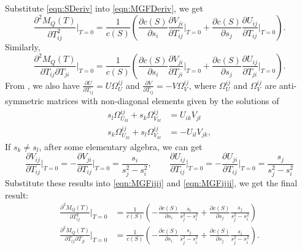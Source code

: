 \documentclass[10pt]{article}
\begin{document}
Substitute \eqref{eqn:SDeriv} into \eqref{eqn:MGFDeriv}, we get
\begin{equation} \label{eqn:MGFijij}
	\frac{\partial^2 M_Q(T)}{\partial T_{ij}^2}\bigg|_{T=0} = \frac{1}{c(S)}\left(\frac{\partial c(S)}{\partial s_i}\frac{\partial V_{ji}}{\partial T_{ij}}\bigg|_{T=0} + \frac{\partial c(S)}{\partial s_j}\frac{\partial U_{ij}}{\partial T_{ij}}\bigg|_{T=0}\right).
\end{equation}
Similarly,
\begin{equation} \label{eqn:MGFijji}
	\frac{\partial^2 M_Q(T)}{\partial T_{ij}\partial T_{ji}}\bigg|_{T=0} = \frac{1}{c(S)}\left(\frac{\partial c(S)}{\partial s_i}\frac{\partial V_{ji}}{\partial T_{ji}}\bigg|_{T=0} + \frac{\partial c(S)}{\partial s_j}\frac{\partial U_{ij}}{\partial T_{ji}}\bigg|_{T=0}\right).
\end{equation}
From \cite{papadopoulo2000estimating}, we also have $\frac{\partial U}{\partial T_{ij}} = U\Omega_U^{ij}$ and $\frac{\partial V}{\partial T_{ij}} = -V\Omega_V^{ij}$, where $\Omega_U^{ij}$ and $\Omega_V^{ij}$ are anti-symmetric matrices with non-diagonal elements given by the solutions of
\begin{align}
	s_l\Omega_{U_{kl}}^{ij} + s_k\Omega_{V_{kl}}^{ij} &= U_{ik}V_{jl} \nonumber \\
	s_k\Omega_{U_{kl}}^{ij} + s_l\Omega_{V_{kl}}^{ij} &= -U_{il}V_{jk},
\end{align}
If $s_k \neq s_l$, after some elementary algebra, we can get
\begin{equation}
	\frac{\partial V_{ij}}{\partial T_{ij}}\big|_{T=0} = -\frac{\partial V_{ji}}{\partial T_{ij}}\big|_{T=0} = \frac{s_i}{s_j^2-s_i^2}, \qquad
	\frac{\partial U_{ij}}{\partial T_{ij}}\big|_{T=0} = -\frac{\partial U_{ji}}{\partial T_{ij}}\big|_{T=0} = \frac{s_j}{s_j^2-s_i^2}
\end{equation}
Substitute these results into \eqref{eqn:MGFijij} and \eqref{eqn:MGFijji}, we get the final result:
\begin{align}
	\frac{\partial^2 M_Q(T)}{\partial T_{ij}^2}\bigg|_{T=0} &= \frac{1}{c(S)}\left(-\frac{\partial c(S)}{\partial s_i}\frac{s_i}{s_j^2-s_i^2}+\frac{\partial c(S)}{\partial s_j}\frac{s_j}{s_j^2-s_i^2}\right) \nonumber \\
	\frac{\partial^2 M_Q(T)}{\partial T_{ij}\partial T_{ji}}\bigg|_{T=0} &= \frac{1}{c(S)}\left(-\frac{\partial c(S)}{\partial s_i}\frac{s_j}{s_j^2-s_i^2}+\frac{\partial c(S)}{\partial s_j}\frac{s_i}{s_j^2-s_i^2}\right).
\end{align}



\end{document}
